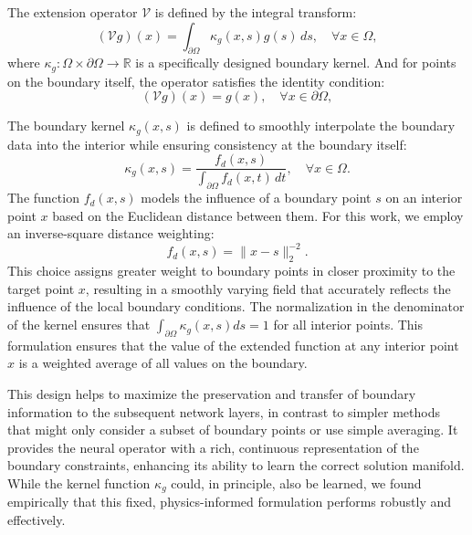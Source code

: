 \documentclass[preprint,11pt]{elsarticle}
\theoremstyle{plain}
\begin{document}
The extension operator $\mathcal{V}$ is defined by the integral transform:
\begin{equation}
(\mathcal{V}g)(x) = \int_{\partial \Omega} \kappa_g(x, s) g(s) \, ds, \quad \forall x \in \Omega,
\label{eq:extension_operator-1}
\end{equation}
where $\kappa_g: \Omega \times \partial \Omega \to \mathbb{R}$ is a specifically designed boundary kernel. And for points on the boundary itself, the operator satisfies the identity condition:
\begin{equation}
(\mathcal{V}g)(x) = g(x), \quad \forall x \in \partial\Omega,
\label{eq:extension_operator-2}
\end{equation}

The boundary kernel $\kappa_g(x, s)$ is defined to smoothly interpolate the boundary data into the interior while ensuring consistency at the boundary itself:
\begin{equation}
\kappa_g(x, s) = \frac{f_d(x, s)}{\int_{\partial\Omega} f_d(x, t) \, dt}, \quad \forall x \in \Omega.
\label{eq:boundary_kernel}
\end{equation}
The function $f_d(x, s)$ models the influence of a boundary point $s$ on an interior point $x$ based on the Euclidean distance between them. For this work, we employ an inverse-square distance weighting:
\begin{equation}
f_d(x, s) = \|x - s\|_2^{-2}.
\end{equation}
This choice assigns greater weight to boundary points in closer proximity to the target point $x$, resulting in a smoothly varying field that accurately reflects the influence of the local boundary conditions. The normalization in the denominator of the kernel ensures that $\int_{\partial\Omega} \kappa_g(x, s) ds = 1$ for all interior points. This formulation ensures that the value of the extended function at any interior point $x$ is a weighted average of all values on the boundary.

This design helps to maximize the preservation and transfer of boundary information to the subsequent network layers, in contrast to simpler methods that might only consider a subset of boundary points or use simple averaging. It provides the neural operator with a rich, continuous representation of the boundary constraints, enhancing its ability to learn the correct solution manifold. While the kernel function $\kappa_g$ could, in principle, also be learned, we found empirically that this fixed, physics-informed formulation performs robustly and effectively.
\end{document}
